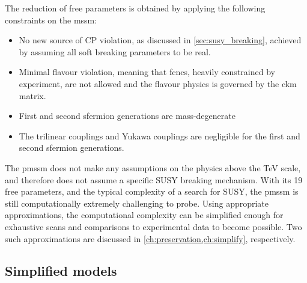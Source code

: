 The reduction of free parameters is obtained by applying the following constraints on the \gls{mssm}:
\begin{itemize}
	\item No new source of CP violation, as discussed in \cref{sec:susy_breaking}, achieved by assuming all soft breaking parameters to be real.
	\item Minimal flavour violation, meaning that \glspl{fcnc}, heavily constrained by experiment, are not allowed and the flavour physics is governed by the \gls{ckm} matrix.
	\item First and second sfermion generations are mass-degenerate
	\item The trilinear couplings and Yukawa couplings are negligible for the first and second sfermion generations.
\end{itemize}
The \gls{pmssm} does not make any assumptions on the physics above the TeV scale, and therefore does not assume a specific SUSY breaking mechanism. With its 19 free parameters, and the typical complexity of a search for SUSY, the \gls{pmssm} is still computationally extremely challenging to probe. Using appropriate approximations, the computational complexity can be simplified enough for exhaustive scans and comparisons to experimental data to become possible. Two such approximations are discussed in \cref{ch:preservation,ch:simplify}, respectively.

\subsection{Simplified models}\label{sec:simplified_models}



